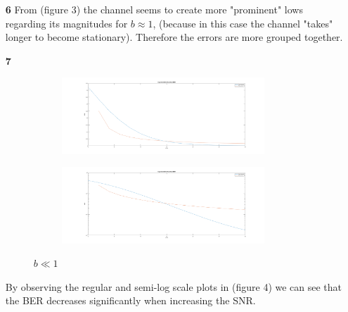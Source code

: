 \documentclass[12pt]{article}
\begin{document}
\begin{enumerate}
		\newpage
		\item[\bf 6]
		From (figure 3) the channel seems to create more "prominent" lows regarding its magnitudes for $b\approx1$, (because in this case the channel "takes" longer to become stationary). Therefore the errors are more grouped together.
	
		\item[\bf 7]
		\begin{figure}[h!]
		\centering
		\begin{subfigure}[b]{\textwidth}
			\centering
			\includegraphics[width=0.9\textwidth]{fig4.png}
		\end{subfigure}
		\begin{subfigure}[b]{\textwidth}
			\centering
			\includegraphics[width=0.9\textwidth]{fig4_b.png}
		\end{subfigure}
		\caption{$b\ll 1$}
		\end{figure}
		By observing the regular and semi-log scale plots in (figure 4) we can see that the BER decreases significantly when increasing the SNR.
		

\end{enumerate}
\end{document}

